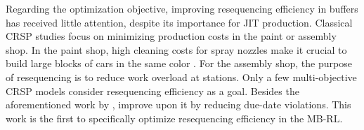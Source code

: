 \documentclass[12pt]{article}
\begin{document}

Regarding the optimization objective, improving resequencing efficiency in buffers has received little attention, despite its importance for JIT production. Classical CRSP studies focus on minimizing production costs in the paint or assembly shop. In the paint shop, high cleaning costs for spray nozzles make it crucial to build large blocks of cars in the same color \citep{sun2017study}. For the assembly shop, the purpose of resequencing is to reduce work overload at stations. Only a few multi-objective CRSP models consider resequencing efficiency as a goal. Besides the aforementioned work by \citet{yu2023analysis}, \citet{leng2023multi} improve upon it by reducing due-date violations. This work is the first to specifically optimize resequencing efficiency in the MB-RL.







\end{document}
